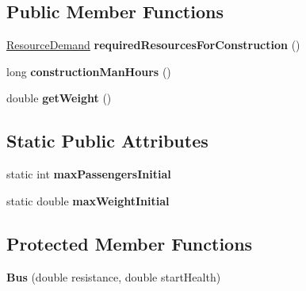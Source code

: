 \subsection*{Public Member Functions}
\begin{DoxyCompactItemize}
\item 
\hyperlink{classuniverse_1_1_resource_demand}{Resource\+Demand} {\bfseries required\+Resources\+For\+Construction} ()\hypertarget{classtools_1_1vehicles_1_1roadgoing_1_1_bus_a37c96647d9fa3b49c5536bf2a50a53b3}{}\label{classtools_1_1vehicles_1_1roadgoing_1_1_bus_a37c96647d9fa3b49c5536bf2a50a53b3}

\item 
long {\bfseries construction\+Man\+Hours} ()\hypertarget{classtools_1_1vehicles_1_1roadgoing_1_1_bus_a81ae73e73913c19fc3fd51e18886b4a2}{}\label{classtools_1_1vehicles_1_1roadgoing_1_1_bus_a81ae73e73913c19fc3fd51e18886b4a2}

\item 
double {\bfseries get\+Weight} ()\hypertarget{classtools_1_1vehicles_1_1roadgoing_1_1_bus_a3bfcab6c30cdb9bc42ebf9da0e06c14b}{}\label{classtools_1_1vehicles_1_1roadgoing_1_1_bus_a3bfcab6c30cdb9bc42ebf9da0e06c14b}

\end{DoxyCompactItemize}
\subsection*{Static Public Attributes}
\begin{DoxyCompactItemize}
\item 
static int {\bfseries max\+Passengers\+Initial}\hypertarget{classtools_1_1vehicles_1_1roadgoing_1_1_bus_a0f6dbe05886e724106d10487c6f5d0c7}{}\label{classtools_1_1vehicles_1_1roadgoing_1_1_bus_a0f6dbe05886e724106d10487c6f5d0c7}

\item 
static double {\bfseries max\+Weight\+Initial}\hypertarget{classtools_1_1vehicles_1_1roadgoing_1_1_bus_a5ddf3774c0c8ea80f90eb00ed219b1af}{}\label{classtools_1_1vehicles_1_1roadgoing_1_1_bus_a5ddf3774c0c8ea80f90eb00ed219b1af}

\end{DoxyCompactItemize}
\subsection*{Protected Member Functions}
\begin{DoxyCompactItemize}
\item 
{\bfseries Bus} (double resistance, double start\+Health)\hypertarget{classtools_1_1vehicles_1_1roadgoing_1_1_bus_a2e257c02a6468c45922e635044ee7d40}{}\label{classtools_1_1vehicles_1_1roadgoing_1_1_bus_a2e257c02a6468c45922e635044ee7d40}

\end{DoxyCompactItemize}
